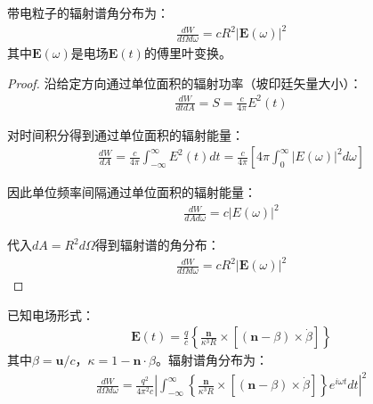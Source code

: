 
\begin{theorem}[辐射谱的角分布]
带电粒子的辐射谱角分布为：
\begin{align}
\frac{dW}{d\Omega d\omega} = cR^2|\mathbf{E}(\omega)|^2
\end{align}
其中$\mathbf{E}(\omega)$是电场$\mathbf{E}(t)$的傅里叶变换。
\end{theorem}

\begin{proof}
沿给定方向通过单位面积的辐射功率（坡印廷矢量大小）：
\begin{align}
\frac{dW}{dtdA} = S = \frac{c}{4\pi} E^2(t)
\end{align}

对时间积分得到通过单位面积的辐射能量：
\begin{align}
\frac{dW}{dA} = \frac{c}{4\pi} \int_{-\infty}^{\infty} E^2(t) dt = \frac{c}{4\pi} \left[ 4\pi \int_0^{\infty} |E(\omega)|^2 d\omega \right]
\end{align}

因此单位频率间隔通过单位面积的辐射能量：
\begin{align}
\frac{dW}{dAd\omega} = c|E(\omega)|^2
\end{align}

代入$dA = R^2 d\Omega$得到辐射谱的角分布：
\begin{align}
\frac{dW}{d\Omega d\omega} = cR^2|\mathbf{E}(\omega)|^2
\end{align}
\end{proof}


\begin{theorem}[单电荷辐射谱的具体表达式]
已知电场形式：
\begin{align}
\mathbf{E}(t) = \frac{q}{c} \left\{ \frac{\mathbf{n}}{\kappa^3 R} \times [(\mathbf{n}-\beta) \times \dot{\beta}] \right\}
\end{align}
其中$\beta = \mathbf{u}/c$，$\kappa = 1 - \mathbf{n} \cdot \beta$。辐射谱角分布为：
\begin{align}
\frac{dW}{d\Omega d\omega} = \frac{q^2}{4\pi^2 c} \left| \int_{-\infty}^{\infty} \left\{ \frac{\mathbf{n}}{\kappa^3 R} \times [(\mathbf{n}-\beta) \times \dot{\beta}] \right\} e^{i\omega t} dt \right|^2
\end{align}
\end{theorem}

